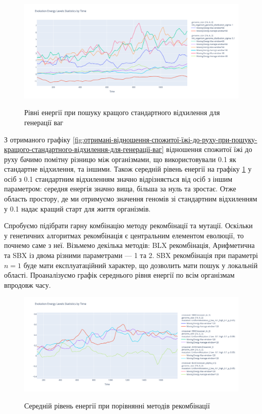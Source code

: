 \begin{figure}[ht]
  \centering
  \caption{Рівні енергії при 
  пошуку кращого стандартного відхилення для генерації ваг}
  \includegraphics[scale=0.3]{Images/best_sigma_comparing_by_energy_levels.png}
  \label{fig:рівні-енергії-при-пошуку-кращого-стандартного-відхилення-для-генерації-ваг}
\end{figure}

З отриманого графіку \ref{fig:отримані-відношення-спожитої-їжі-до-руху-при-пошуку-кращого-стандартного-відхилення-для-генерації-ваг}
відношення спожитої їжі до руху бачимо помітну різницю
між організмами, що використовували 0.1 як стандартне відхилення, та іншими.
Також середній рівень енергії на графіку 
\ref{fig:рівні-енергії-при-пошуку-кращого-стандартного-відхилення-для-генерації-ваг}
у осіб з 0.1 стандартним відхиленням значно 
відрізняється від осіб з іншим параметром:
середня енергія значно вища, більша за нуль та зростає.
Отже область простору, де ми отримуємо значення геномів
зі стандартним відхиленням у 0.1 надає кращий старт для
життя організмів.




Спробуємо підібрати гарну комбінацію методу рекомбінації
та мутації.
Оскільки у генетичних алгоритмах рекомбінація є центральним
елементом еволюції, то почнемо саме з неї.
Візьмемо декілька методів: BLX рекомбінація, Арифметична та
SBX із двома різними параметрами --- 1 та 2.
SBX рекомбінація при параметрі $n = 1$ буде мати
експлуатаційний характер, що дозволить мати пошук у локальній області.
Проаналізуємо графік середнього рівня енергії
по всім організмам впродовж часу.

\begin{figure}[ht]
  \centering
  \caption{Середній рівень енергії при 
  порівнянні методів рекомбінації}
  \includegraphics[scale=0.33]{Images/comparing_crossovers_sbx_arithmetic_blx05.png}
  \label{fig:середній-рівень-енергії-при-порівнянні-методів-рекомбінації}
\end{figure}

